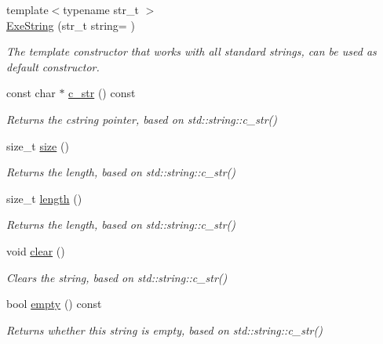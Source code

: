 \begin{DoxyCompactItemize}
\item 
{\footnotesize template$<$typename str\+\_\+t $>$ }\\\hyperlink{class_triton_1_1_util_1_1_exe_string_aa1e51c0f3eeb4e76940c5169c88cae0f}{Exe\+String} (str\+\_\+t string= \textquotesingle{}\textquotesingle{})
\begin{DoxyCompactList}\small\item\em The template constructor that works with all standard strings, can be used as default constructor. \end{DoxyCompactList}\item 
const char $\ast$ \hyperlink{class_triton_1_1_util_1_1_exe_string_aafca5e0900fa1ed18b87125eaa11055b}{c\+\_\+str} () const 
\begin{DoxyCompactList}\small\item\em Returns the cstring pointer, based on std\+::string\+::c\+\_\+str() \end{DoxyCompactList}\item 
size\+\_\+t \hyperlink{class_triton_1_1_util_1_1_exe_string_a5c54fb86aab92b08f1e62c05aa9335a4}{size} ()
\begin{DoxyCompactList}\small\item\em Returns the length, based on std\+::string\+::c\+\_\+str() \end{DoxyCompactList}\item 
size\+\_\+t \hyperlink{class_triton_1_1_util_1_1_exe_string_ad5530545d9ed9179bc66d0192f201eff}{length} ()
\begin{DoxyCompactList}\small\item\em Returns the length, based on std\+::string\+::c\+\_\+str() \end{DoxyCompactList}\item 
void \hyperlink{class_triton_1_1_util_1_1_exe_string_aee04e2282a4e43fa520235d6fc83c43f}{clear} ()
\begin{DoxyCompactList}\small\item\em Clears the string, based on std\+::string\+::c\+\_\+str() \end{DoxyCompactList}\item 
bool \hyperlink{class_triton_1_1_util_1_1_exe_string_a25d440c02f9fb26551d083ac8703eb04}{empty} () const 
\begin{DoxyCompactList}\small\item\em Returns whether this string is empty, based on std\+::string\+::c\+\_\+str() \end{DoxyCompactList}\item 

\end{DoxyCompactItemize}

